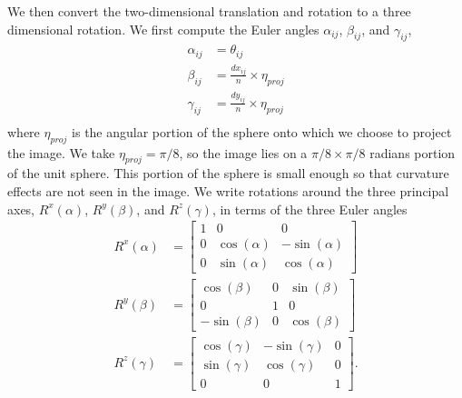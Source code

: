 \documentclass{pnastwo}
\begin{document}
\begin{article}
\begin{materials}
%
%
We then convert the two-dimensional translation and rotation to a three dimensional rotation. 
%
We first compute the Euler angles $\alpha_{ij}$, $\beta_{ij}$, and $\gamma_{ij}$,
\begin{equation} \label{eq:angle_relations}
\begin{aligned}
	\alpha_{ij} &= \theta_{ij} \\
	\beta_{ij} &= \frac{dx_{ij}}{n} \times \eta_{proj} \\
	\gamma_{ij} &= \frac{dy_{ij}}{n} \times \eta_{proj} \\
\end{aligned}
\end{equation}
where $\eta_{proj}$ is the angular portion of the sphere onto which we choose to project the image.
%
We take $\eta_{proj} =  \pi/8$, so the image lies on a $\pi/8 \times \pi/8$ radians portion of the unit sphere.
%
This portion of the sphere is small enough so that curvature effects are not seen in the image.
%
We write rotations around the three principal axes, $R^x(\alpha)$, $R^y(\beta)$, and $R^z(\gamma)$, in terms of the three Euler angles
\begin{equation}
\begin{aligned}
	R^x(\alpha) &= \begin{bmatrix}
	1 & 0 & 0 \\
    0 & \cos(\alpha) & -\sin(\alpha) \\
    0 & \sin(\alpha) & \cos(\alpha)
	\end{bmatrix} \\
	R^y(\beta) &= \begin{bmatrix}
	\cos(\beta) & 0 & \sin(\beta) \\
    0 & 1 & 0 \\
    -\sin(\beta) & 0 & \cos(\beta)
    \end{bmatrix} \\
	R^z(\gamma) &= \begin{bmatrix} 
	\cos(\gamma) & -\sin(\gamma) & 0 \\
    \sin(\gamma) & \cos(\gamma) & 0 \\
    0 & 0 & 1 
    \end{bmatrix}.
\end{aligned}
\end{equation}

\end{materials}
\end{article}
\end{document}
